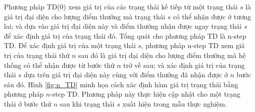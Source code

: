 Phương pháp TD(0) xem giá trị của các trạng thái kế tiếp từ một trạng thái $s$ là giá trị đại diện cho lượng điểm thưởng mà trạng thái $s$ có thể nhận được ở tương lai; và dựa vào giá trị đại diện này và điểm thưởng nhận được ngay trạng thái $s$ để xác định giá trị của trạng thái đó. Tổng quát cho phương pháp TD là n-step TD. Để xác định giá trị của một trạng thái $s$, phương pháp n-step TD xem giá trị của trạng thái thứ $n$ sau đó là giá trị đại diện cho lượng điểm thưởng mà hệ thống có thể nhận được từ bước thứ $n$ trở về sau; và xác định giá trị của trạng thái $s$ dựa trên giá trị đại diện này cùng với điểm thưởng đã nhận được ở $n$ bước sáu đó. Hình \ref{fig:n_TD} minh họa cách xác định hàm giá trị trạng thái bằng phương pháp $n$-step TD. Phương pháp này thực hiện cập nhật cho một trạng thái ở bước thứ $n$ sau khi trạng thái $s$ xuất hiện trong mẫu thực nghiệm. 
